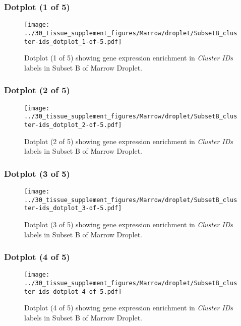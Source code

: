 \clearpage

\subsubsection{Dotplot (1 of 5)}
\begin{figure}[h]
\centering
\texttt{[image: ../30\_tissue\_supplement\_figures/Marrow/droplet/SubsetB\_cluster-ids\_dotplot\_1-of-5.pdf]}

\caption{ Dotplot (1 of 5)  showing gene expression enrichment in \emph{Cluster IDs} labels in Subset B of Marrow Droplet. }
\end{figure}


\clearpage

\subsubsection{Dotplot (2 of 5)}
\begin{figure}[h]
\centering
\texttt{[image: ../30\_tissue\_supplement\_figures/Marrow/droplet/SubsetB\_cluster-ids\_dotplot\_2-of-5.pdf]}

\caption{ Dotplot (2 of 5)  showing gene expression enrichment in \emph{Cluster IDs} labels in Subset B of Marrow Droplet. }
\end{figure}


\clearpage

\subsubsection{Dotplot (3 of 5)}
\begin{figure}[h]
\centering
\texttt{[image: ../30\_tissue\_supplement\_figures/Marrow/droplet/SubsetB\_cluster-ids\_dotplot\_3-of-5.pdf]}

\caption{ Dotplot (3 of 5)  showing gene expression enrichment in \emph{Cluster IDs} labels in Subset B of Marrow Droplet. }
\end{figure}


\clearpage

\subsubsection{Dotplot (4 of 5)}
\begin{figure}[h]
\centering
\texttt{[image: ../30\_tissue\_supplement\_figures/Marrow/droplet/SubsetB\_cluster-ids\_dotplot\_4-of-5.pdf]}

\caption{ Dotplot (4 of 5)  showing gene expression enrichment in \emph{Cluster IDs} labels in Subset B of Marrow Droplet. }
\end{figure}


